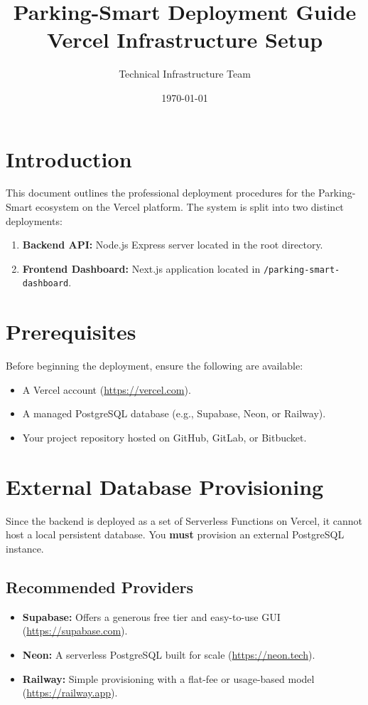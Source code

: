 \documentclass[12pt,a4paper]{article}
\title{\Huge Parking-Smart Deployment Guide \\ \Large Vercel Infrastructure Setup}
\author{Technical Infrastructure Team}
\date{\today}
\begin{document}
\maketitle
\tableofcontents
\newpage

\section{Introduction}
This document outlines the professional deployment procedures for the Parking-Smart ecosystem on the Vercel platform. The system is split into two distinct deployments:
\begin{enumerate}
    \item \textbf{Backend API:} Node.js Express server located in the root directory.
    \item \textbf{Frontend Dashboard:} Next.js application located in \texttt{/parking-smart-dashboard}.
\end{enumerate}

\section{Prerequisites}
Before beginning the deployment, ensure the following are available:
\begin{itemize}
    \item A Vercel account (\url{https://vercel.com}).
    \item A managed PostgreSQL database (e.g., Supabase, Neon, or Railway).
    \item Your project repository hosted on GitHub, GitLab, or Bitbucket.
\end{itemize}

\section{External Database Provisioning}
Since the backend is deployed as a set of Serverless Functions on Vercel, it cannot host a local persistent database. You \textbf{must} provision an external PostgreSQL instance.

\subsection{Recommended Providers}
\begin{itemize}
    \item \textbf{Supabase:} Offers a generous free tier and easy-to-use GUI (\url{https://supabase.com}).
    \item \textbf{Neon:} A serverless PostgreSQL built for scale (\url{https://neon.tech}).
    \item \textbf{Railway:} Simple provisioning with a flat-fee or usage-based model (\url{https://railway.app}).
\end{itemize}
\end{document}
